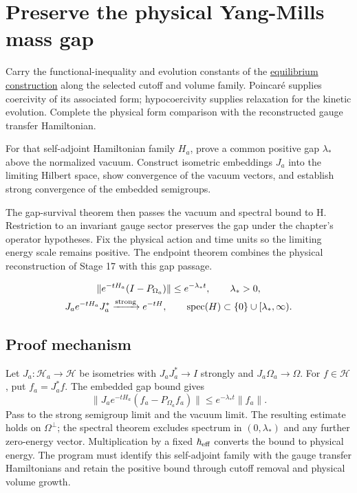 \documentclass[11pt,a4paper]{article}
\begin{document}
\section{Preserve the physical Yang-Mills mass gap}
\label{stage:18}
Carry the functional-inequality and evolution constants of the \hyperref[sec:equilibrium-thermodynamics]{equilibrium construction} along the selected cutoff and volume family. Poincar\'e supplies coercivity of its associated form; hypocoercivity supplies relaxation for the kinetic evolution. Complete the physical form comparison with the reconstructed gauge transfer Hamiltonian.

For that self-adjoint Hamiltonian family \(H_a\), prove a common positive gap \(\lambda_*\) above the normalized vacuum. Construct isometric embeddings \(J_a\) into the limiting Hilbert space, show convergence of the vacuum vectors, and establish strong convergence of the embedded semigroups.

The gap-survival theorem then passes the vacuum and spectral bound to H. Restriction to an invariant gauge sector preserves the gap under the chapter's operator hypotheses. Fix the physical action and time units so the limiting energy scale remains positive. The endpoint theorem combines the physical reconstruction of Stage 17 with this gap passage.


\begin{gather*}
\|e^{-tH_a}(I-P_{\Omega_a})\|\le e^{-\lambda_*t},\qquad \lambda_*>0,\\
J_ae^{-tH_a}J_a^*\xrightarrow{\rm strong}e^{-tH},\qquad
\operatorname{spec}(H)\subset\{0\}\cup[\lambda_*,\infty).
\end{gather*}
\subsection*{Proof mechanism}
Let \(J_a:\mathcal H_a\to\mathcal H\) be isometries with \(J_aJ_a^*\to I\) strongly and \(J_a\Omega_a\to\Omega\). For \(f\in\mathcal H\), put \(f_a=J_a^*f\). The embedded gap bound gives
\[\|J_ae^{-tH_a}(f_a-P_{\Omega_a}f_a)\|\le e^{-\lambda_*t}\|f_a\|.\]
Pass to the strong semigroup limit and the vacuum limit. The resulting estimate holds on \(\Omega^\perp\); the spectral theorem excludes spectrum in \((0,\lambda_*)\) and any further zero-energy vector. Multiplication by a fixed \(\hbar_{\rm eff}\) converts the bound to physical energy. The program must identify this self-adjoint family with the gauge transfer Hamiltonians and retain the positive bound through cutoff removal and physical volume growth.
\end{document}
